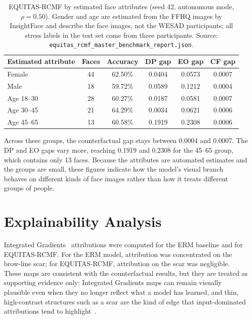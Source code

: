 \begin{table}[htbp]
\centering
\begin{tabular}{@{}lccccc@{}}
\toprule
\textbf{Estimated attribute} & \textbf{Faces} & \textbf{Accuracy} & \textbf{DP gap} & \textbf{EO gap} & \textbf{CF gap} \\
\midrule
Female & 44 & 62.50\% & 0.0404 & 0.0573 & 0.0007 \\
Male & 18 & 59.72\% & 0.0589 & 0.1212 & 0.0004 \\
Age 18--30 & 28 & 60.27\% & 0.0187 & 0.0581 & 0.0007 \\
Age 30--45 & 21 & 64.29\% & 0.0034 & 0.0621 & 0.0006 \\
Age 45--65 & 13 & 60.58\% & 0.1919 & 0.2308 & 0.0006 \\
\bottomrule
\end{tabular}
\caption{EQUITAS-RCMF by estimated face attributes (seed 42, autonomous mode, $\rho = 0.50$). Gender and age are estimated from the FFHQ images by InsightFace and describe the face images, not the WESAD participants; all stress labels in the test set come from three participants. Source: \texttt{equitas\_rcmf\_master\_benchmark\_report.json}.}
\label{tab:demographic_audit}
\end{table}

Across these groups, the counterfactual gap stays between 0.0004 and 0.0007. The DP and EO gaps vary more, reaching 0.1919 and 0.2308 for the 45--65 group, which contains only 13 faces. Because the attributes are automated estimates and the groups are small, these figures indicate how the model's visual branch behaves on different kinds of face images rather than how it treats different groups of people.

\section{Explainability Analysis}
Integrated Gradients~\cite{sundararajan2017} attributions were computed for the ERM baseline and for EQUITAS-RCMF. For the ERM model, attribution was concentrated on the brow-line scar; for EQUITAS-RCMF, attribution on the scar was negligible. These maps are consistent with the counterfactual results, but they are treated as supporting evidence only: Integrated Gradients maps can remain visually plausible even when they no longer reflect what a model has learned, and thin, high-contrast structures such as a scar are the kind of edge that input-dominated attributions tend to highlight~\cite{adebayo2018}.

